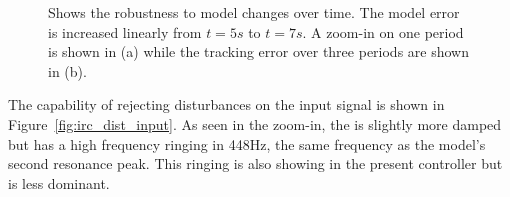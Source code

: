 \begin{figure}[h!]
  \centering %
  \qquad
  \caption{\label{fig:irc_dist} Shows the robustness to model changes over time. The model error is increased linearly from $t=5s$ to $t=7s$.  A zoom-in on one period is shown in (a) while the tracking error over three periods are shown in (b).}
\end{figure}

\FloatBarrier
The \abbrIRC capability of rejecting disturbances on the input signal is shown in Figure~\ref{fig:irc_dist_input}. As seen in the zoom-in, the \abbrIRC is slightly more damped but has a high frequency ringing in 448Hz, the same frequency as the model's second resonance peak. This ringing is also showing in the present controller but is less dominant.

